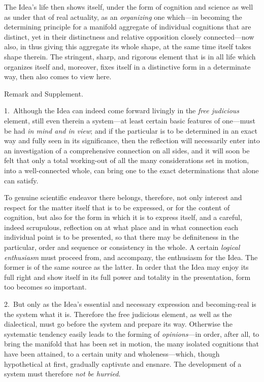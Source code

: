 \documentclass[12pt,a4paper]{book}
\begin{document}
The Idea's life then shows itself, under the form of cognition and science as well as
under that of real actuality, as an \emph{organizing} one which---in becoming the
determining principle for a manifold aggregate of individual cognitions that are
distinct, yet in their distinctness and relative opposition closely connected---now
also, in thus giving this aggregate its whole shape, at the same time itself takes shape
therein. The stringent, sharp, and rigorous element that is in all life which organizes
itself and, moreover, fixes itself in a distinctive form in a determinate way, then also
comes to view here.

\begin{center}Remark and Supplement.\end{center}
1.~Although the Idea can indeed come forward livingly in the \emph{free judicious}
element, still even therein a system---at least certain basic features of one---must be
had \emph{in mind and in view}; and if the particular is to be determined in an exact way
and fully seen in its significance, then the reflection will necessarily enter into an
investigation of a comprehensive connection on all sides, and it will soon be felt that
only a total working-out of all the many considerations set in motion, into a
well-connected whole, can bring one to the exact determinations that alone can satisfy.

To genuine scientific endeavor there belongs, therefore, not only interest and respect
for the matter itself that is to be expressed, or for the content of cognition, but also
for the form in which it is to express itself, and a careful, indeed scrupulous,
reflection on at what place and in what connection each individual point is to be
presented, so that there may be definiteness in the particular, order and sequence or
consistency in the whole. A certain \emph{logical enthusiasm} must proceed from, and
accompany, the enthusiasm for the Idea. The former is of the same source as the latter.
In order that the Idea may enjoy its full right and show itself in its full power and
totality in the presentation, form too becomes so important.

2.~But only as the Idea's essential and necessary expression and becoming-real is the
system what it is. Therefore the free judicious element, as well as the dialectical, must
go before the system and prepare its way. Otherwise the systematic tendency easily leads
to the forming of \emph{opinions}---in order, after all, to bring the manifold that has
been set in motion, the many isolated cognitions that have been attained, to a certain
unity and wholeness---which, though hypothetical at first, gradually captivate and
ensnare. The development of a system must therefore \emph{not be hurried}.
\end{document}

